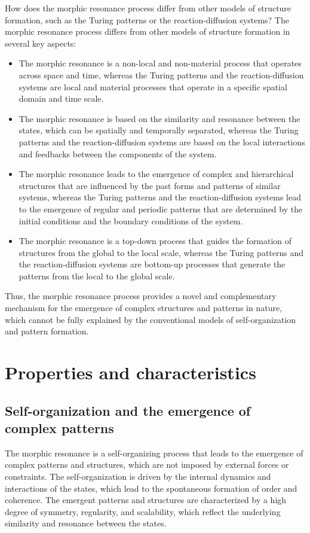 \begin{tcolorbox}[colback=green!5!white,colframe=green!75!black,title=Question]
How does the morphic resonance process differ from other models of structure formation, such as the Turing patterns or the reaction-diffusion systems?
\tcblower
The morphic resonance process differs from other models of structure formation in several key aspects:
\begin{itemize}
\item The morphic resonance is a non-local and non-material process that operates across space and time, whereas the Turing patterns and the reaction-diffusion systems are local and material processes that operate in a specific spatial domain and time scale.
\item The morphic resonance is based on the similarity and resonance between the states, which can be spatially and temporally separated, whereas the Turing patterns and the reaction-diffusion systems are based on the local interactions and feedbacks between the components of the system.
\item The morphic resonance leads to the emergence of complex and hierarchical structures that are influenced by the past forms and patterns of similar systems, whereas the Turing patterns and the reaction-diffusion systems lead to the emergence of regular and periodic patterns that are determined by the initial conditions and the boundary conditions of the system.
\item The morphic resonance is a top-down process that guides the formation of structures from the global to the local scale, whereas the Turing patterns and the reaction-diffusion systems are bottom-up processes that generate the patterns from the local to the global scale.
\end{itemize}
Thus, the morphic resonance process provides a novel and complementary mechanism for the emergence of complex structures and patterns in nature, which cannot be fully explained by the conventional models of self-organization and pattern formation.
\end{tcolorbox}

\section{Properties and characteristics}
\subsection{Self-organization and the emergence of complex patterns}
The morphic resonance is a self-organizing process that leads to the emergence of complex patterns and structures, which are not imposed by external forces or constraints. The self-organization is driven by the internal dynamics and interactions of the states, which lead to the spontaneous formation of order and coherence. The emergent patterns and structures are characterized by a high degree of symmetry, regularity, and scalability, which reflect the underlying similarity and resonance between the states.


